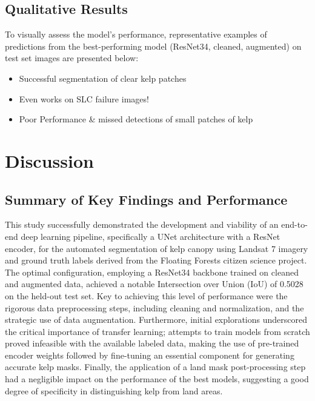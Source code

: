 \documentclass{article}
\begin{document}
\subsection{Qualitative Results} %

To visually assess the model's performance, representative examples of predictions from the best-performing model (ResNet34, cleaned, augmented) on test set images are presented below:

\begin{itemize}
    \item Successful segmentation of clear kelp patches
    \item Even works on SLC failure images!
    \item Poor Performance \& missed detections of small patches of kelp
\end{itemize}

\section{Discussion}

\subsection{Summary of Key Findings and Performance}

This study successfully demonstrated the development and viability of an end-to-end deep learning pipeline, specifically a UNet architecture with a ResNet encoder, for the automated segmentation of kelp canopy using Landsat 7 imagery and ground truth labels derived from the Floating Forests citizen science project. The optimal configuration, employing a ResNet34 backbone trained on cleaned and augmented data, achieved a notable Intersection over Union (IoU) of 0.5028 on the held-out test set. Key to achieving this level of performance were the rigorous data preprocessing steps, including cleaning and normalization, and the strategic use of data augmentation. Furthermore, initial explorations underscored the critical importance of transfer learning; attempts to train models from scratch proved infeasible with the available labeled data, making the use of pre-trained encoder weights followed by fine-tuning an essential component for generating accurate kelp masks. Finally, the application of a land mask post-processing step had a negligible impact on the performance of the best models, suggesting a good degree of specificity in distinguishing kelp from land areas.
\end{document}

